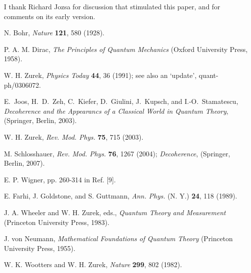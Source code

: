 \documentclass[aps,twocolumn,pra]{revtex4}
\newcommand{\+}         {\dagger}
\newcommand\hocom[1]{}%
\begin{document}
\hocom{Same ``indecision'' is true in quantum phase transitions. There, only broken symmetry states are 
in evidence, and detection of their symmetric superposition is all but impossible when a large number
of subsystems is involved: Only a global measurement on all microscopic subsystems could reveal 
the phase between the two obvious alternatives in the case of quantum Ising. By the same token, 
only global measurements of the whole environment can exhibit coherence between branches 
defined by redundant imprinting of information in quantum Darwinism. We have signaled some of 
the analogies that arise, but investigating them in detail is beyond the scope of this paper. }

I thank Richard Jozsa for discussion that stimulated this paper, and for
comments on its early version.

\smallskip


\smallskip

\noindent [1] N. Bohr, {\it Nature} {\bf 121}, 580 (1928).

\noindent [2] P. A. M. Dirac, {\it The Principles of Quantum Mechanics} (Oxford University Press, 1958).

\noindent [3] W. H. Zurek, {\it Physics Today} {\bf 44}, 36 (1991); see also
an `update', quant-ph/0306072.

\noindent [4] E.~Joos, H.~D.~Zeh, C.~Kiefer, D.~Giulini, J.~Kupsch, and 
I.-O.~Stamatescu, {\it Decoherence and the Appearancs of 
a Classical World in Quantum Theory}, (Springer, Berlin, 2003).

\noindent [5] W. H. Zurek, {\it Rev. Mod. Phys.} {\bf 75}, 715 (2003).

\noindent [6] M. Schlosshauer, {\it Rev. Mod. Phys.} {\bf 76}, 1267 (2004); {\it Decoherence}, 
(Springer, Berlin, 2007).

\noindent [7] E. P. Wigner, pp. 260-314 in Ref. [9].

\noindent [8] E. Farhi, J. Goldstone, and S. Guttmann, {\it Ann. Phys.} (N. Y.) {\bf 24}, 118 (1989).

\noindent [9] J. A. Wheeler and W. H. Zurek, eds., {\it Quantum Theory and
Measurement} (Princeton University Press, 1983).

\noindent [10] J. von Neumann, {\it Mathematical Foundations of Quantum Theory} (Princeton University Press, 1955).

\noindent [11] W. K. Wootters and W. H. Zurek, {\it Nature} {\bf 299}, 802 (1982).
\end{document}

